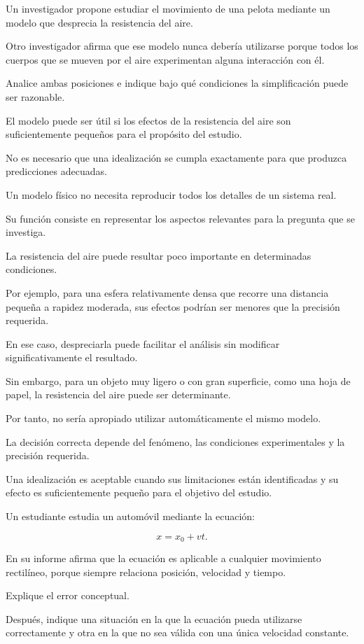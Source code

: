 \begin{ejercicio}
Un investigador propone estudiar el movimiento de una pelota mediante un modelo que desprecia la resistencia del aire.

Otro investigador afirma que ese modelo nunca debería utilizarse porque todos los cuerpos que se mueven por el aire experimentan alguna interacción con él.

Analice ambas posiciones e indique bajo qué condiciones la simplificación puede ser razonable.
\end{ejercicio}

\begin{respuesta}
El modelo puede ser útil si los efectos de la resistencia del aire son suficientemente pequeños para el propósito del estudio.

No es necesario que una idealización se cumpla exactamente para que produzca predicciones adecuadas.
\end{respuesta}

\begin{explicacion}
Un modelo físico no necesita reproducir todos los detalles de un sistema real.

Su función consiste en representar los aspectos relevantes para la pregunta que se investiga.

La resistencia del aire puede resultar poco importante en determinadas condiciones.

Por ejemplo, para una esfera relativamente densa que recorre una distancia pequeña a rapidez moderada, sus efectos podrían ser menores que la precisión requerida.

En ese caso, despreciarla puede facilitar el análisis sin modificar significativamente el resultado.

Sin embargo, para un objeto muy ligero o con gran superficie, como una hoja de papel, la resistencia del aire puede ser determinante.

Por tanto, no sería apropiado utilizar automáticamente el mismo modelo.

La decisión correcta depende del fenómeno, las condiciones experimentales y la precisión requerida.

Una idealización es aceptable cuando sus limitaciones están identificadas y su efecto es suficientemente pequeño para el objetivo del estudio.
\end{explicacion}


\begin{ejercicio}
Un estudiante estudia un automóvil mediante la ecuación:

\[x=x_0+vt.\]

En su informe afirma que la ecuación es aplicable a cualquier movimiento rectilíneo, porque siempre relaciona posición, velocidad y tiempo.

Explique el error conceptual.

Después, indique una situación en la que la ecuación pueda utilizarse correctamente y otra en la que no sea válida con una única velocidad constante.
\end{ejercicio}

